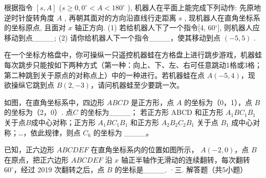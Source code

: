 \item
  根据指令 $[s, A]$ ($s \geqslant 0, 0^{\circ} < A < 180^{\circ}$ ), 机器人在平面上能完成下列动作: 先原地逆时针旋转角度 $A$ , 再朝其面对的方向沿直线行走距离 $s$ , 现机器人在直角坐标系的坐标原点, 且面对 $x$ 轴正方向.
(1) 若给机器人下了一个指令[4, 60$^\circ$], 则机器人应移动到点\_\_\_\_;
(2) 请你给机器人下一个指令\_\_\_\_，使其移动到点 $(-5, 5)$ .\underline{\hspace{2cm}}

\item
  在一个坐标方格盘中，你可操纵一只遥控机器蛙在方格盘上进行跳步游戏，机器蛙每次跳步只能按如下两种方式（第一种：向上、下、左、右可任意跳动1格或3格；第二种跳到关于原点的对称点上）中的一种进行。若机器蛙在点 $A(-5, 4)$，现欲操纵它跳到点 $B(2,-3)$，请问机器蛙至少要跳一次。\underline{\hspace{2cm}}

\item
  如图，在直角坐标系中，四边形 $ABCD$ 是正方形，点 $A$ 的坐标为（0，1），点 $B$ 的坐标为（2，0）.
点$C$ 的坐标为\_\_\_\_；
若正方形 ABCD 和正方形 $A_{1}BC_{1}B_{1}$ 关于点$B$成中心对称；正方形 $A_{1}BC_{1}B_{1}$ 和正方形 $A_{2}B_{2}C_{2}B_{1}$ 关于点 $B_{1}$ 成中心对称；…，依此规律，则点 $C_{6}$ 的坐标为 \_\_\_\_。\underline{\hspace{2cm}}


\item
  已知，正六边形 $ABCDEF$ 在直角坐标系内的位置如图所示， $A(-2,0)$，点 $B$ 在原点，把正六边形 $ABCDEF$ 沿 $x$ 轴正半轴作无滑动的连续翻转，每次翻转 $60^\circ$，经过 2019 次翻转之后，点 $B$ 的坐标是\_\_\_\_.
·三. 解答题（共5小题）\underline{\hspace{2cm}}


\item

